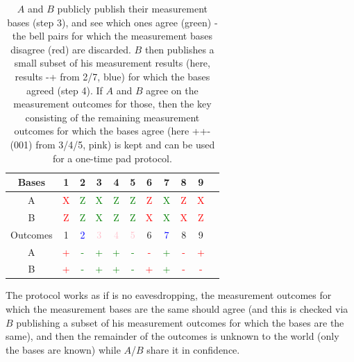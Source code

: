 \begin{table}[htbp]
    \centering\begin{tabular}{|c|c|c|c|c|c|c|c|c|c|c|}
         \hline Bases & 1 & 2 & 3 & 4 & 5 & 6 & 7 & 8 & 9
         \\ \hline A & \textcolor{red}{X} & \textcolor{green}{Z} & \textcolor{green}{X} & \textcolor{green}{Z} & \textcolor{green}{Z} & \textcolor{red}{Z} & \textcolor{green}{X} & \textcolor{red}{Z} & \textcolor{red}{X} 
         \\ \hline B & \textcolor{red}{Z} & \textcolor{green}{Z} & \textcolor{green}{X} & \textcolor{green}{Z} & \textcolor{green}{Z} & \textcolor{red}{X} & \textcolor{green}{X} & \textcolor{red}{X} & \textcolor{red}{Z} 
         \\ \hline Outcomes & 1 & \textcolor{blue}{2} & \textcolor{pink}{3} & \textcolor{pink}{4} & \textcolor{pink}{5} & 6 & \textcolor{blue}{7} & 8 & 9 
         \\ \hline A & \textcolor{red}{+} & \textcolor{green}{-} & \textcolor{green}{+} & \textcolor{green}{+} & \textcolor{green}{-} & \textcolor{red}{-} & \textcolor{green}{+} & \textcolor{red}{-} & \textcolor{red}{+} 
         \\ \hline B & \textcolor{red}{+} & \textcolor{green}{-} & \textcolor{green}{+} & \textcolor{green}{+} & \textcolor{green}{-} & \textcolor{red}{+} & \textcolor{green}{+} & \textcolor{red}{-} & \textcolor{red}{-} 
         \\ \hline
    \end{tabular}
    \caption{$A$ and $B$ publicly publish their measurement bases (step 3), and see which ones agree (green) - the bell pairs for which the measurement bases disagree (red) are discarded. $B$ then publishes a small subset of his measurement results (here, results -+ from 2/7, blue) for which the bases agreed (step 4). If $A$ and $B$ agree on the measurement outcomes for those, then the key consisting of the remaining measurement outcomes for which the bases agree (here ++- (001) from 3/4/5, pink) is kept and can be used for a one-time pad protocol.}
    \label{table-BB84}
\end{table}

The protocol works as if is no eavesdropping, the measurement outcomes for which the measurement bases are the same should agree (and this is checked via $B$ publishing a subset of his measurement outcomes for which the bases are the same), and then the remainder of the outcomes is unknown to the world (only the bases are known) while $A$/$B$ share it in confidence.

